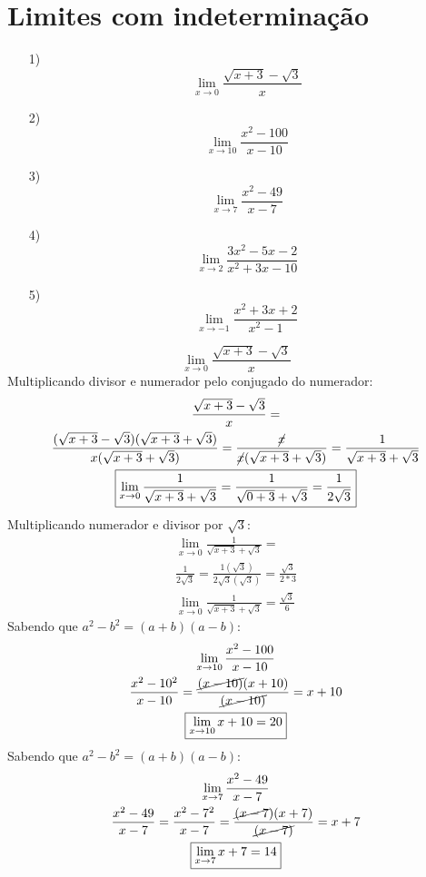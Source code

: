 \documentclass{jhwhw}
\begin{document}
\chapter{Limites com indeterminação}
\begin{enumerate}
    \item [1)] \[
              \lim_{x \to 0} \frac{\sqrt{x+3}-\sqrt{3}}{x}
          \]
    \item [2)] \[
              \lim_{x \to 10} \frac{x^2-100}{x-10}
          \]
    \item [3)] \[
              \lim_{x \to 7} \frac{x^2-49}{x-7}
          \]
    \item [4)] \[
              \lim_{x \to 2} \frac{3x^2-5x-2}{x^2+3x-10}
          \]
    \item [5)] \[
              \lim_{x \to -1} \frac{x^2+3x+2}{x^2-1}
          \]
\end{enumerate}
\newpage
{}
$$\lim_{x \to 0} \frac{\sqrt{x+3}-\sqrt{3}}{x}$$
Multiplicando divisor e numerador pelo conjugado do numerador:
\begin{multline*}
    \frac{\sqrt{x+3}-\sqrt{3}}{x} =\\ \frac{(\sqrt{x+3}-\sqrt{3})(\sqrt{x+3}+\sqrt{3})}{x(\sqrt{x+3}+\sqrt{3})} = 
    \frac{\cancel{x}}{\cancel{x}(\sqrt{x+3}+\sqrt{3})} = 
    \frac{1}{\sqrt{x+3}+\sqrt{3}} \\
    \boxed{\lim_{x \to 0} \frac{1}{\sqrt{x+3}+\sqrt{3}} = 
    \frac{1}{\sqrt{0+3}+\sqrt{3}} 
    =\frac{1}{2\sqrt{3}}}
\end{multline*}
Multiplicando numerador e divisor por $\sqrt{3}$:
\begin{multline*}
    \lim_{x \to 0} \frac{1}{\sqrt{x+3}+\sqrt{3}} =\\ 
    \frac{1}{2\sqrt{3}} = 
    \frac{1(\sqrt{3})}{2\sqrt{3}(\sqrt{3})} = 
    \frac{\sqrt{3}}{2*3} \\ 
    \boxed{\lim_{x \to 0} \frac{1}{\sqrt{x+3}+\sqrt{3}} = \frac{\sqrt{3}}{6}}
\end{multline*}
Sabendo que $a^2 - b^2 = (a+b)(a-b)$:
\begin{multline*}
    \lim_{x \to 10} \frac{x^2-100}{x-10} \\
    \frac{x^2-10^2}{x-10} = \frac{\cancel{(x-10)}(x+10)}{\cancel{(x-10)}} = x+10 \\
    \boxed{\lim_{x\to10} x+10 = 20}
\end{multline*}
Sabendo que $a^2 - b^2 = (a+b)(a-b)$:
\begin{multline*}
    \lim_{x \to 7} \frac{x^2-49}{x-7}\\
    \frac{x^2 - 49}{x-7} = \frac{x^2 - 7^2}{x-7} = \frac{\cancel{(x-7})(x+7)}{\cancel{(x-7)}} = x+7\\
    \boxed{\lim_{x \to 7} x+7 = 14}
\end{multline*}
\end{document}
